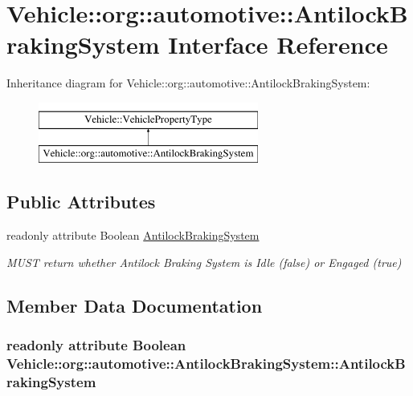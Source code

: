 \hypertarget{interfaceVehicle_1_1org_1_1automotive_1_1AntilockBrakingSystem}{\section{Vehicle\-:\-:org\-:\-:automotive\-:\-:Antilock\-Braking\-System Interface Reference}
\label{interfaceVehicle_1_1org_1_1automotive_1_1AntilockBrakingSystem}
}
Inheritance diagram for Vehicle\-:\-:org\-:\-:automotive\-:\-:Antilock\-Braking\-System\-:\begin{figure}[H]
\begin{center}
\leavevmode
\includegraphics[height=2.000000cm]{interfaceVehicle_1_1org_1_1automotive_1_1AntilockBrakingSystem}
\end{center}
\end{figure}
\subsection*{Public Attributes}
\begin{DoxyCompactItemize}
\item 
readonly attribute Boolean \hyperlink{interfaceVehicle_1_1org_1_1automotive_1_1AntilockBrakingSystem_a95b1894048407bacc4b9f7b45be15b65}{Antilock\-Braking\-System}
\begin{DoxyCompactList}\small\item\em M\-U\-S\-T return whether Antilock Braking System is Idle (false) or Engaged (true) \end{DoxyCompactList}\end{DoxyCompactItemize}


\subsection{Member Data Documentation}
\hypertarget{interfaceVehicle_1_1org_1_1automotive_1_1AntilockBrakingSystem_a95b1894048407bacc4b9f7b45be15b65}{
\subsubsection[{Antilock\-Braking\-System}]{\setlength{\rightskip}{0pt plus 5cm}readonly attribute Boolean Vehicle\-::org\-::automotive\-::\-Antilock\-Braking\-System\-::\-Antilock\-Braking\-System}}\label{interfaceVehicle_1_1org_1_1automotive_1_1AntilockBrakingSystem_a95b1894048407bacc4b9f7b45be15b65}


